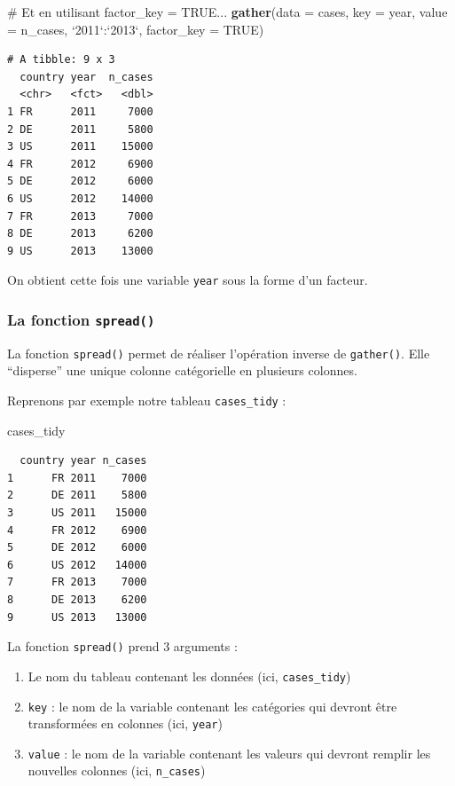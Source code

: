 \documentclass[a4paperpaper,]{article}
\newenvironment{Shaded}{\begin{snugshade}}{\end{snugshade}}
\newcommand{\CommentTok}[1]{\textcolor[rgb]{0.54,0.53,0.53}{#1}}
\newcommand{\DataTypeTok}[1]{\textcolor[rgb]{0.00,0.34,0.68}{#1}}
\newcommand{\KeywordTok}[1]{\textcolor[rgb]{0.12,0.11,0.11}{\textbf{#1}}}
\newcommand{\NormalTok}[1]{\textcolor[rgb]{0.12,0.11,0.11}{#1}}
\newcommand{\OperatorTok}[1]{\textcolor[rgb]{0.12,0.11,0.11}{#1}}
\newcommand{\OtherTok}[1]{\textcolor[rgb]{0.00,0.43,0.16}{#1}}
\newcommand{\StringTok}[1]{\textcolor[rgb]{0.75,0.01,0.01}{#1}}
\providecommand{\tightlist}{%
  \setlength{\itemsep}{0pt}\setlength{\parskip}{0pt}}
\theoremstyle{definition}
\theoremstyle{definition}
\theoremstyle{definition}
\theoremstyle{remark}
\begin{document}
\begin{Shaded}
\begin{Highlighting}[]
\CommentTok{# Et en utilisant factor_key = TRUE...}
\KeywordTok{gather}\NormalTok{(}\DataTypeTok{data =}\NormalTok{ cases, }\DataTypeTok{key =}\NormalTok{ year, }\DataTypeTok{value =}\NormalTok{ n_cases, }\StringTok{`}\DataTypeTok{2011}\StringTok{`}\OperatorTok{:}\StringTok{`}\DataTypeTok{2013}\StringTok{`}\NormalTok{, }\DataTypeTok{factor_key =} \OtherTok{TRUE}\NormalTok{)}
\end{Highlighting}
\end{Shaded}

\begin{verbatim}
# A tibble: 9 x 3
  country year  n_cases
  <chr>   <fct>   <dbl>
1 FR      2011     7000
2 DE      2011     5800
3 US      2011    15000
4 FR      2012     6900
5 DE      2012     6000
6 US      2012    14000
7 FR      2013     7000
8 DE      2013     6200
9 US      2013    13000
\end{verbatim}

On obtient cette fois une variable \texttt{year} sous la forme d'un
facteur.

\hypertarget{spread}{%
\subsubsection{\texorpdfstring{La fonction
\texttt{spread()}}{La fonction spread()}}\label{spread}}

La fonction \texttt{spread()} permet de réaliser l'opération inverse de
\texttt{gather()}. Elle ``disperse'' une unique colonne catégorielle en
plusieurs colonnes.

Reprenons par exemple notre tableau \texttt{cases\_tidy} :

\begin{Shaded}
\begin{Highlighting}[]
\NormalTok{cases_tidy}
\end{Highlighting}
\end{Shaded}

\begin{verbatim}
  country year n_cases
1      FR 2011    7000
2      DE 2011    5800
3      US 2011   15000
4      FR 2012    6900
5      DE 2012    6000
6      US 2012   14000
7      FR 2013    7000
8      DE 2013    6200
9      US 2013   13000
\end{verbatim}

La fonction \texttt{spread()} prend 3 arguments :

\begin{enumerate}
\def\labelenumi{\arabic{enumi}.}
\tightlist
\item
  Le nom du tableau contenant les données (ici, \texttt{cases\_tidy})
\item
  \texttt{key} : le nom de la variable contenant les catégories qui
  devront être transformées en colonnes (ici, \texttt{year})
\item
  \texttt{value} : le nom de la variable contenant les valeurs qui
  devront remplir les nouvelles colonnes (ici, \texttt{n\_cases})
\end{enumerate}
\end{document}
